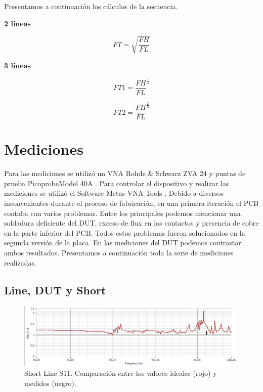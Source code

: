 \documentclass[10pt, a4paper, twocolumn]{article}
\begin{document}
Presentamos a continuación los cálculos de la secuencia.

\textbf{2 líneas} \newline

\large
\begin{equation}
\boxed{ FT = \sqrt{\frac{FH}{FL}} }
\end{equation}
\normalsize

\textbf{3 líneas} \newline

\large
\begin{equation}
\boxed{ FT1 = \frac{FH}{FL}^\frac{1}{3} }
\end{equation}
\normalsize

\large
\begin{equation}
\boxed{ FT2 = \frac{FH}{FL}^\frac{2}{3} }
\end{equation}
\normalsize

\section{Mediciones}

Para las mediciones se utilizó un VNA Rohde \& Schwarz ZVA 24 \cite{vna} y puntas
de prueba Picoprobe\textregistered Model 40A \cite{probe}. Para controlar el dispositivo
y realizar las mediciones se utilizó el Software Metas VNA Tools \cite{metas}. Debido a diversos inconvenientes durante el proceso de fabricación, en una primera iteración el PCB contaba con varios problemas. Entre los principales podemos mencionar una soldadura deficiente del DUT, exceso de flux en los
contactos y presencia de cobre en la parte inferior del PCB. Todos estos problemas fueron solucionados
en la segunda versión de la placa. En las mediciones del DUT podemos contrastar ambos resultados. Presentamos a continuación toda la serie de mediciones realizadas. \newline

\subsection{Line, DUT y Short}

\begin{figure}[hbt!]
	\includegraphics[width=\linewidth]{Fotos/Mediciones/L1_S11.PNG}
	\caption{Short Line S11. Comparación entre los valores ideales (rojo) y medidos (negro).}
\end{figure}
\end{document}
